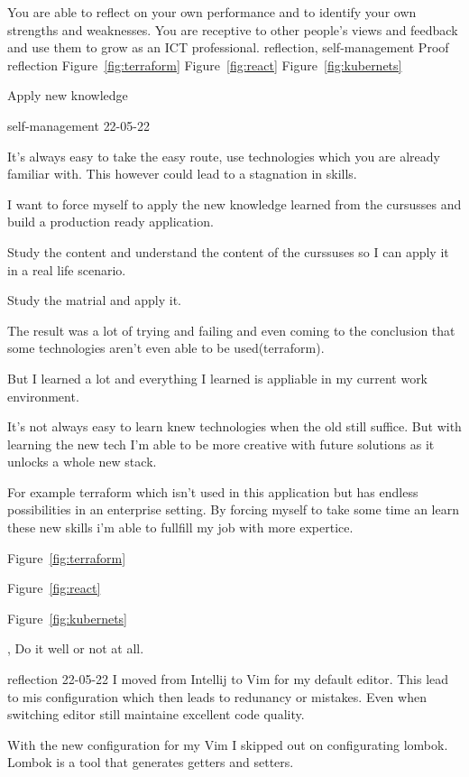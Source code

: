 \competentie
{%
	\competentieformulier
	{%
		You are able to reflect on your own performance and to identify your own strengths and weaknesses. You are receptive to other people's views and feedback and use them to grow as an ICT professional.
	}
	{%
		reflection,%
		self-management%
	}
	{%
		Proof
	}
	{%
		reflection
	}
	{%
		Figure~\ref{fig:terraform}
		Figure~\ref{fig:react}
		Figure~\ref{fig:kubernets}
	}
}
{%
	\bewijs
	{
		Apply new knowledge
	}
	{%
		\starr
		{%
			self-management
		}
		{%
			22-05-22
		}
		{%
			It's always easy to take the easy route, use technologies which you are already familiar with.
			This however could lead to a stagnation in skills.

			I want to force myself to apply the new knowledge learned from the cursusses and build a production ready application.
		}
		{%
			Study the content and understand the content of the curssuses so I can apply it in a real life scenario.
		}
		{%
			Study the matrial and apply it.

		}
		{%
			The result was a lot of trying and failing and even coming to the conclusion that some technologies aren't even able to be used(terraform).

			But I learned a lot and everything I learned is appliable in my current work environment.

		}
		{%
			It's not always easy to learn knew technologies when the old still suffice.
			But with learning the new tech I'm able to be more creative with future solutions as it unlocks a whole new stack.

			For example terraform which isn't used in this application but has endless possibilities in an enterprise setting.
			By forcing myself to take some time an learn these new skills i'm able to fullfill my job with more expertice.
		}
		{

		}
	}
	{%

		Figure~\ref{fig:terraform}

		Figure~\ref{fig:react}

		Figure~\ref{fig:kubernets}
	},
	\bewijs
	{
		Do it well or not at all.
	}
	{%
		\starr
		{%
			reflection
		}
		{%
			22-05-22
		}
		{%
			I moved from Intellij to Vim for my default editor.
			This lead to mis configuration which then leads to redunancy or mistakes.
		}
		{%
			Even when switching editor still maintaine excellent code quality.
		}
		{%
			With the new configuration for my Vim I skipped out on configurating lombok.
			Lombok is a tool that generates getters and setters.


}}}
